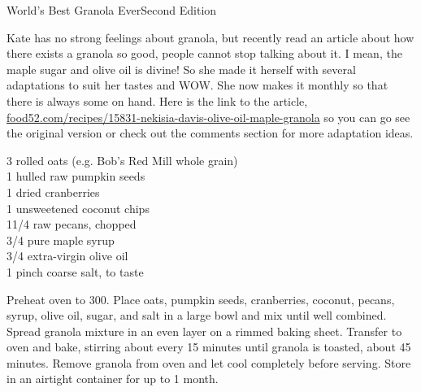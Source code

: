 \begin{entry}{World's Best Granola Ever}{Second Edition}

\begin{open}
  Kate has no strong feelings about granola, but recently read an article
  about how there exists a granola so good, people cannot stop talking about
  it. I mean, the maple sugar and olive oil is divine! So she made it herself
  with several adaptations to suit her tastes and WOW. She now makes it
  monthly so that there is always some on hand. Here is the link to the
  article,
  \url{food52.com/recipes/15831-nekisia-davis-olive-oil-maple-granola} so you
  can go see the original version or check out the comments section for more
  adaptation ideas.
\end{open}
\begin{ingredients}
    \SI{3}{\cup} rolled oats (e.g. Bob's Red Mill whole grain)\\
    \SI{1}{\cup} hulled raw pumpkin seeds\\
    \SI{1}{\cup} dried cranberries\\
    \SI{1}{\cup} unsweetened coconut chips\\
    1\SI{1/4}{\cup} raw pecans, chopped\\
    \SI{3/4}{\cup} pure maple syrup\\
    \SI{3/4}{\cup} extra-virgin olive oil\\
    1 pinch coarse salt, to taste
\end{ingredients}
Preheat oven to \SI{300}{\degreeF}. Place oats, pumpkin seeds, cranberries,
coconut, pecans, syrup, olive oil, sugar, and salt in a large bowl and mix
until well combined. Spread granola mixture in an even layer on a rimmed
baking sheet. Transfer to oven and bake, stirring about every 15 minutes until
granola is toasted, about 45 minutes. Remove granola from oven and let cool
completely before serving. Store in an airtight container for up to 1 month.
\end{entry}


